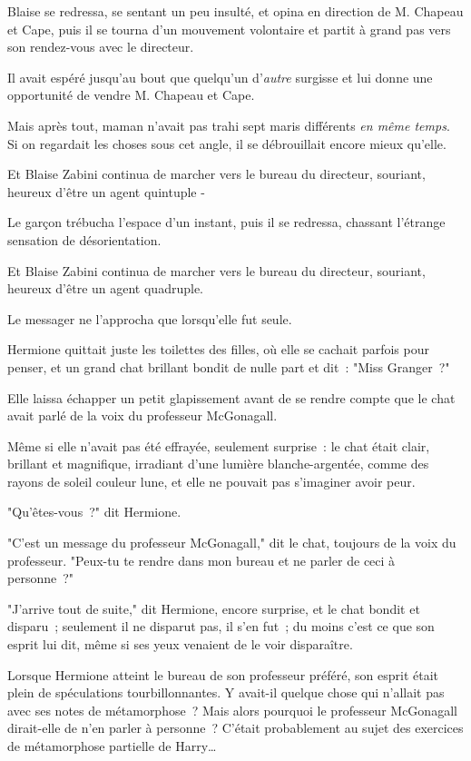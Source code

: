 Blaise se redressa, se sentant un peu insulté, et opina en direction de M. Chapeau et Cape, puis il se tourna d'un mouvement volontaire et partit à grand pas vers son rendez-vous avec le directeur.

Il avait espéré jusqu'au bout que quelqu'un d'\emph{autre} surgisse et lui donne une opportunité de vendre M. Chapeau et Cape.

Mais après tout, maman n'avait pas trahi sept maris différents \emph{en même temps}. Si on regardait les choses sous cet angle, il se débrouillait encore mieux qu'elle.

Et Blaise Zabini continua de marcher vers le bureau du directeur, souriant, heureux d'être un agent quintuple -

Le garçon trébucha l'espace d'un instant, puis il se redressa, chassant l'étrange sensation de désorientation.

Et Blaise Zabini continua de marcher vers le bureau du directeur, souriant, heureux d'être un agent quadruple.


Le messager ne l'approcha que lorsqu'elle fut seule.

Hermione quittait juste les toilettes des filles, où elle se cachait parfois pour penser, et un grand chat brillant bondit de nulle part et dit~: "Miss Granger~?"

Elle laissa échapper un petit glapissement avant de se rendre compte que le chat avait parlé de la voix du professeur McGonagall.

Même si elle n'avait pas été effrayée, seulement surprise~: le chat était clair, brillant et magnifique, irradiant d'une lumière blanche-argentée, comme des rayons de soleil couleur lune, et elle ne pouvait pas s'imaginer avoir peur.

"Qu'êtes-vous~?" dit Hermione.

"C'est un message du professeur McGonagall," dit le chat, toujours de la voix du professeur. "Peux-tu te rendre dans mon bureau et ne parler de ceci à personne~?"

"J'arrive tout de suite," dit Hermione, encore surprise, et le chat bondit et disparu~; seulement il ne disparut pas, il s'en fut~; du moins c'est ce que son esprit lui dit, même si ses yeux venaient de le voir disparaître.

Lorsque Hermione atteint le bureau de son professeur préféré, son esprit était plein de spéculations tourbillonnantes. Y avait-il quelque chose qui n'allait pas avec ses notes de métamorphose~? Mais alors pourquoi le professeur McGonagall dirait-elle de n'en parler à personne~? C'était probablement au sujet des exercices de métamorphose partielle de Harry…

